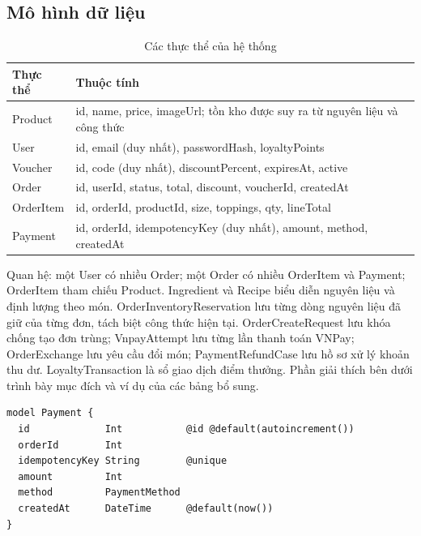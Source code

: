 \documentclass[a4paper]{article}
\begin{document}
\subsection{Mô hình dữ liệu}
\begin{table}[h!]
\centering
\footnotesize
\begin{tabularx}{\textwidth}{|l|X|}
\hline
\textbf{Thực thể} & \textbf{Thuộc tính} \\ \hline
Product & id, name, price, imageUrl; tồn kho được suy ra từ nguyên liệu và công thức \\ \hline
User & id, email (duy nhất), passwordHash, loyaltyPoints \\ \hline
Voucher & id, code (duy nhất), discountPercent, expiresAt, active \\ \hline
Order & id, userId, status, total, discount, voucherId, createdAt \\ \hline
OrderItem & id, orderId, productId, size, toppings, qty, lineTotal \\ \hline
Payment & id, orderId, idempotencyKey (duy nhất), amount, method, createdAt \\ \hline
\end{tabularx}
\caption{Các thực thể của hệ thống}
\end{table}

Quan hệ: một User có nhiều Order; một Order có nhiều OrderItem và Payment; OrderItem tham chiếu Product. Ingredient và Recipe biểu diễn nguyên liệu và định lượng theo món. OrderInventoryReservation lưu từng dòng nguyên liệu đã giữ của từng đơn, tách biệt công thức hiện tại. OrderCreateRequest lưu khóa chống tạo đơn trùng; VnpayAttempt lưu từng lần thanh toán VNPay; OrderExchange lưu yêu cầu đổi món; PaymentRefundCase lưu hồ sơ xử lý khoản thu dư. LoyaltyTransaction là sổ giao dịch điểm thưởng. Phần giải thích bên dưới trình bày mục đích và ví dụ của các bảng bổ sung.



\begin{lstlisting}[style=brew]
model Payment {
  id             Int           @id @default(autoincrement())
  orderId        Int
  idempotencyKey String        @unique
  amount         Int
  method         PaymentMethod
  createdAt      DateTime      @default(now())
}
\end{lstlisting}
\end{document}
